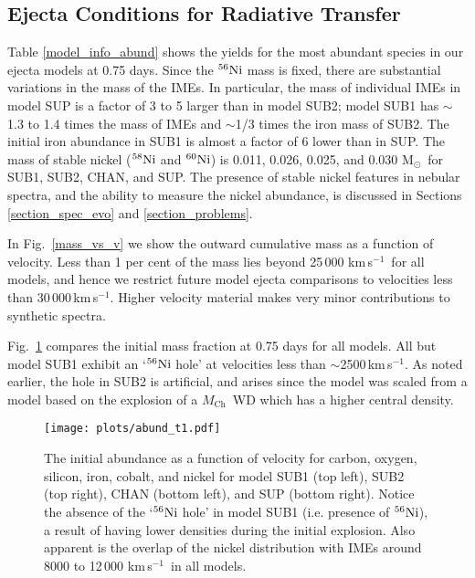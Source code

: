 \documentclass[useAMS,usenatbib,useasmath]{mnras}
\newcommand{\Mch}{\hbox{$M_{\text{Ch}}$}}
\newcommand{\Msun}{\hbox{M$_\odot$}}
\newcommand{\kms}{\hbox{km$\,$s$^{-1}$}}
\newcommand{\elem}[2][default]{$^{#1}{\rm #2}$}
\def\fig{Fig.}
\begin{document}
\subsection{Ejecta Conditions for Radiative Transfer}
Table \ref{model_info_abund} shows the yields for the most abundant species in our ejecta models at 0.75 days. Since the \elem[56]{Ni} mass is fixed, there are substantial variations in the mass of the IMEs. 
In particular, the mass of individual IMEs in model SUP is a factor of 3 to 5 larger than in model SUB2; model SUB1 has $\sim$1.3 to 1.4 times the mass of IMEs and $\sim$1/3 times the iron mass of SUB2. The initial iron abundance in SUB1 is almost a factor of 6 lower than in SUP. The mass of stable nickel (\elem[58]{Ni} and \elem[60]{Ni}) is 0.011, 0.026, 0.025, and 0.030 \Msun\ for SUB1, SUB2, CHAN, and SUP. The presence of stable nickel features in nebular spectra, and the ability to measure the nickel abundance, is discussed in Sections \ref{section_spec_evo} and \ref{section_problems}.

In \fig~\ref{mass_vs_v} we show the outward cumulative mass as a function of velocity. Less than 1 per cent of the mass lies beyond 25\,000 \kms\ for all models, and hence we restrict future model ejecta comparisons to velocities less than 30\,000\,\kms. Higher velocity material makes very minor contributions to synthetic spectra.

\fig~\ref{initial_rho_all} compares the initial mass fraction at 0.75 days for all models. All but model SUB1 exhibit an `\elem[56]{Ni} hole' at velocities less than $\sim$2500\,\kms. As noted earlier, the hole in SUB2 is artificial, and arises since the model was scaled from a model based on the explosion of a \Mch\ WD which has a higher central density.%
  
\begin{figure*} 
\begin{minipage}[t]{\linewidth}
\centering
\texttt{[image: plots/abund\_t1.pdf]}
\end{minipage}
\caption{The initial abundance as a function of velocity for carbon, oxygen, silicon, iron, cobalt, and nickel for model SUB1 (top left), SUB2 (top right), CHAN (bottom left), and SUP (bottom right). Notice the absence of the `\elem[56]{Ni} hole' in model SUB1 (i.e. presence of \elem[56]{Ni}), a result of having lower densities during the initial explosion. Also apparent is the  overlap of the nickel distribution with IMEs around 8000 to 12\,000 \kms\ in all models.}
\label{initial_rho_all}
\end{figure*}
\end{document}
